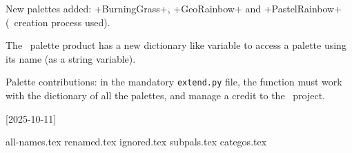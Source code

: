 \documentclass{tutodoc}
\begin{document}
\begin{tdocnew}
    \item New palettes added: +BurningGrass+, +GeoRainbow+ and +PastelRainbow+ (\LUADRAW\ creation process used).

    \item The \LUADRAW\ palette product has a new dictionary like variable  to access a palette using its name (as a string variable).
\end{tdocnew}




\begin{tdocupdate}
    \item Palette contributions: in the mandatory \verb+extend.py+ file, the  function must work with the dictionary of all the palettes, and manage a credit to the \thisproj\ project.
\end{tdocupdate}

\tdocsep

[2025-10-11]



\normalsize

\newpage
{all-names.tex}
\newpage
{renamed.tex}
\newpage
{ignored.tex}
\newpage
{subpals.tex}
\newpage
{categos.tex}
\end{document}
